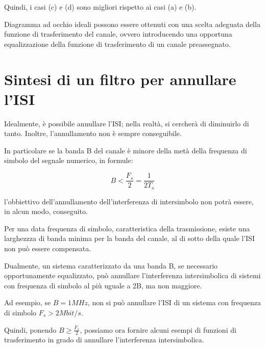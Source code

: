 Quindi, i casi (c) e (d) sono migliori rispetto ai casi (a) e (b). \newline 

Diagramma ad occhio ideali possono essere ottenuti con una scelta adeguata della funzione di trasferimento del canale, ovvero introducendo una opportuna equalizzazione della funzione di trasferimento di un canale preassegnato. \newline 

\newpage 

\section{Sintesi di un filtro per annullare l'ISI} 

Idealmente, è possibile annullare l'ISI; nella realtà, si cercherà di diminuirlo di tanto. \newline 
Inoltre, l'annullamento non è sempre conseguibile.\newline 

In particolare se la banda B del canale è minore della metà della frequenza di simbolo del segnale numerico, 
in formule: 

{
    \Large 
    \begin{equation}
        B < \frac{F_s}{2} = \frac{1}{2 T_s}    
    \end{equation}
} 

l'obbiettivo dell'annullamento dell'interferenza di intersimbolo non potrà essere, in alcun modo, conseguito. \newline 

Per una data frequenza di simbolo, caratteristica della trasmissione, esiste una larghezzza di banda minima per la banda del canale, al di sotto della quale l'ISI non può essere compensata. \newline 

Dualmente, un sistema caratterizzato da una banda B, se necessario opportunamente equalizzato, può annullare l'interferenza intersimbolica di sistemi con frequenza di simbolo al più uguale a 2B, ma non maggiore. \newline 

Ad esempio, se $B = 1 MHz$, non si può annullare l'ISI di un sistema con frequenza di simbolo $F_s > 2 Mbit/s$. \newline 

Quindi, ponendo $B \geq \frac{F_s}{2}$, possiamo ora fornire alcuni esempi di funzioni di trasferimento in grado di annullare l'interferenza intersimbolica. \newline 

